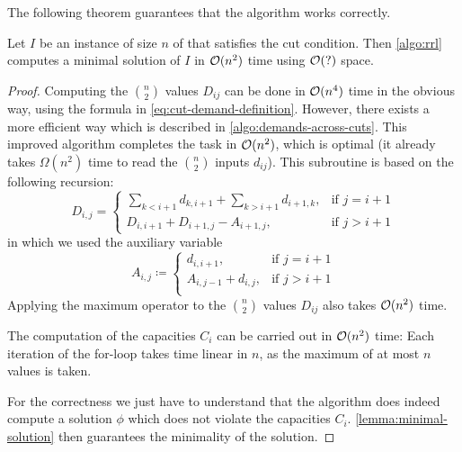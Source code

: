 The following theorem guarantees that the algorithm works correctly.
\begin{theorem}
	\label{theo:rll-algo-correct}
	Let $I$ be an instance of size $n$ of \RRL that satisfies the cut condition.
	Then \cref{algo:rrl} computes a minimal solution of $I$ in $\mathcal{O}(n^2)$ time using $\mathcal{O}(?)$ space.
\end{theorem}
\begin{proof}
	Computing the $\binom{n}{2}$ values $D_{ij}$ can be done in $\mathcal{O}(n^4)$ time in the obvious way, using the formula in \cref{eq:cut-demand-definition}.
	However, there exists a more efficient way which is described in \cref{algo:demands-across-cuts}.
	This improved algorithm completes the task in $\mathcal{O}(n^2)$, which is optimal (it already takes $\Omega(n^2)$ time to read the $\binom{n}{2}$ inputs $d_{ij}$).
	This subroutine is based on the following recursion:
	\begin{equation}
		D_{i, j} = \begin{cases}
			\sum_{k < i+1} d_{k,i+1} + \sum_{k > i+1} d_{i+1, k}, & \text{if } j = i+1 \\
			D_{i, i+1} + D_{i+1, j} - A_{i+1, j}, & \text{if } j > i+1
		\end{cases}
	\end{equation}
	in which we used the auxiliary variable
	\begin{equation}
		A_{i, j} \coloneqq \begin{cases}
				d_{i, i+1}, & \text{if } j = i+1\\
				A_{i, j-1} + d_{i, j}, &\text{if } j > i+1\\
		\end{cases}
	\end{equation}
	Applying the maximum operator to the $\binom{n}{2}$ values $D_{ij}$ also takes $\mathcal{O}(n^2)$ time.
	
	The computation of the capacities $C_i$ can be carried out in $\mathcal{O}(n^2)$ time:
	Each iteration of the for-loop takes time linear in $n$, as the maximum of at most $n$ values is taken.
	
	For the correctness we just have to understand that the algorithm does indeed compute a solution $\phi$ which does not violate the capacities $C_i$.
	\cref{lemma:minimal-solution} then guarantees the minimality of the solution.
	
	
\end{proof}

